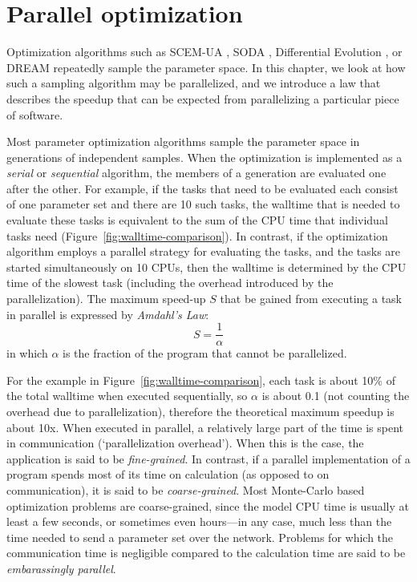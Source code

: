 \chapter{Parallel optimization}
\label{ch:parallel-optimization}

Optimization algorithms such as SCEM-UA \citep{vrug-gupt-bout-soro-2003}, SODA \citep{vrug-diks-gupt-bout-vers-2005}, Differential Evolution \citep{stor-pric-1997}, or DREAM \citep{vrug-terb-diks-robi-hyma-higd-2009} repeatedly sample the parameter space. In this chapter, we look at how such a sampling algorithm may be parallelized, and we introduce a law that describes the speedup that can be expected from parallelizing a particular piece of software.

Most parameter optimization algorithms sample the parameter space in generations of independent samples. When the optimization is implemented as a \textit{serial } or \textit{sequential} algorithm, the members of a generation are evaluated one after the other. For example, if the tasks that need to be evaluated each consist of one parameter set and there are 10 such tasks, the walltime that is needed to evaluate these tasks is equivalent to the sum of the CPU time that individual tasks need (Figure~\ref{fig:walltime-comparison}). In contrast, if the optimization algorithm employs a parallel strategy for evaluating the tasks, and the tasks are started simultaneously on 10 CPUs, then the walltime is determined by the CPU time of the slowest task (including the overhead introduced by the parallelization). The maximum speed-up $S$ that be gained from executing a task in parallel is expressed by \textit{Amdahl's Law}:
\begin{equation}
S=\frac{1}{\alpha}
\label{eq:amdahls-law}
\end{equation}
in which $\alpha$ is the fraction of the program that cannot be parallelized.

For the example in Figure~\ref{fig:walltime-comparison}, each task is about 10\% of the total walltime when executed sequentially, so $\alpha$ is about 0.1 (not counting the overhead due to parallelization), therefore the theoretical maximum speedup is about 10x. When executed in parallel, a relatively large part of the time is spent in communication (`parallelization overhead'). When this is the case, the application is said to be \textit{fine-grained}. In contrast, if a parallel implementation of a program spends most of its time on calculation (as opposed to on communication), it is said to be \textit{coarse-grained}. Most Monte-Carlo based optimization problems are coarse-grained, since the model CPU time is usually at least a few seconds, or sometimes even hours---in any case, much less than the time needed to send a parameter set over the network. Problems for which the communication time is negligible compared to the calculation time are said to be \textit{embarassingly parallel}.


